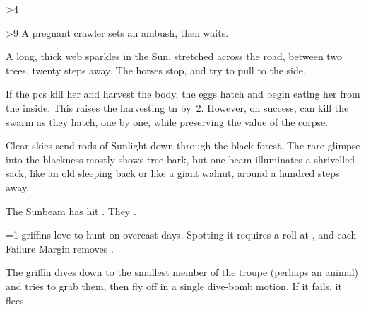 \ifnum\value{cycle}>4

  \ifnum\value{r12}>9%
    A pregnant \gls{crawler} sets an ambush, then waits.

    \label{crawlerStatblock}

    \begin{boxtext}
      A long, thick web sparkles in the Sun, stretched across the road, between two trees, twenty \glspl{step} away.
      The horses stop, and try to pull to the side.
    \end{boxtext}

    If the \glspl{pc} kill her and harvest the body, the eggs hatch and begin eating her from the inside.
    This raises the \gls{harvesting} \gls{tn} by~2.
    However, on success,  can kill the swarm as they hatch, one by one, while preserving the value of the corpse.

    \crawlerSwarm

  \else%
    \begin{boxtext}
      Clear skies send rods of Sunlight down through the black forest.
      The rare glimpse into the blackness mostly shows tree-bark, but one beam illuminates a shrivelled sack, like an old sleeping back or like a giant walnut, around a hundred \glspl{step} away.
    \end{boxtext}

    The Sunbeam has hit .
    They .

  \fi

\else
  \ifnum\value{temperature}=1
    \Glspl{griffin} love to hunt on overcast days.
    Spotting it requires a  roll at \tn[12], and each Failure Margin removes .


    The \gls{griffin} dives down to the smallest member of the troupe (perhaps an animal) and tries to grab them, then fly off in a single dive-bomb motion.
    If it fails, it flees.

  \fi

\fi

